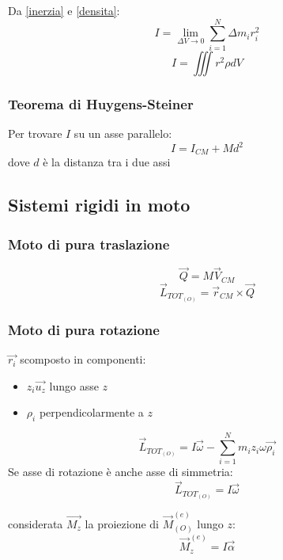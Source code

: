 Da \eqref{inerzia} e \eqref{densita}:
\begin{equation*}
    I = \lim_{\Delta V \to 0} \sum_{i=1}^{N} \Delta m_i r_i^2
\end{equation*}
\begin{equation}
    \boxed{I = \iiint r^2 \rho dV} 
\end{equation}

\subsubsection{Teorema di Huygens-Steiner}
Per trovare $I$ su un asse parallelo:
\begin{equation}
    \boxed{I = I_{CM} + M d^2}
    \label{teoHS}
\end{equation}
dove $d$ è la distanza tra i due assi


\subsection{Sistemi rigidi in moto}
\subsubsection{Moto di pura traslazione}
\begin{equation*}
    \vec{Q} = M \vec{V}_{CM}
\end{equation*}
\begin{equation}
    \vec{L}_{TOT_{(O)}} = \vec{r}_{CM} \times \vec{Q}
\end{equation}
\subsubsection{Moto di pura rotazione}
$\vec{r_i}$ scomposto in componenti: 
\begin{itemize}
    \item $z_i \vec{u_z}$ lungo asse $z$
    \item $\rho_i$ perpendicolarmente a $z$
\end{itemize}
\begin{equation}
    \vec{L}_{TOT_{(O)}} = I \vec{\omega} - \sum_{i=1}^{N} m_i z_i \omega \vec{\rho_i}
\end{equation}
Se asse di rotazione è anche asse di simmetria:
\begin{equation}
    \boxed{\vec{L}_{TOT_{(O)}} = I \vec{\omega}}
\end{equation}

considerata $\vec{M_z}$ la proiezione di $\vec{M}_{(O)}^{(e)}$ lungo $z$:
\begin{equation}
        \boxed{\vec{M}_z^{(e)} = I \vec{\alpha}}
\end{equation}

